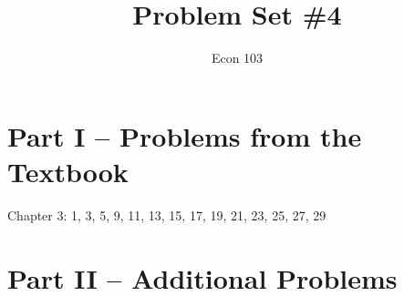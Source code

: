 \documentclass[addpoints,12pt]{exam}
\title{Problem Set \#4}
\author{Econ 103}
\date{}
\begin{document}
\maketitle

\section*{Part I -- Problems from the Textbook}
Chapter 3: 1, 3, 5, 9, 11, 13, 15, 17, 19, 21, 23, 25, 27, 29


\section*{Part II -- Additional Problems}
\end{document}
